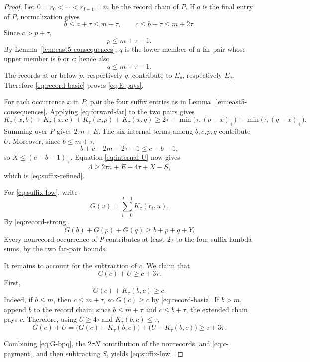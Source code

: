 \documentclass[11pt]{article}
\theoremstyle{definition}
\theoremstyle{remark}
\begin{document}
\begin{proof}
Let \(0=r_0<\cdots<r_{I-1}=m\) be the record chain of \(P\).  If
\(a\) is the final entry of \(P\), normalization gives
\[
  b\le a+\tau\le m+\tau,
  \qquad c\le b+\tau\le m+2\tau.
\]
Since \(c>p+\tau\),
\[
  p\le m+\tau-1.
\]
By Lemma~\ref{lem:east5-consequences}, \(q\) is the lower member of a
far pair whose upper member is \(b\) or \(c\); hence also
\[
  q\le m+\tau-1.
\]
The records at or below \(p\), respectively \(q\), contribute to
\(E_p\), respectively \(E_q\).  Therefore
\eqref{eq:record-basic} proves \eqref{eq:E-pays}.

For each occurrence \(x\) in \(P\), pair the four suffix entries as in
Lemma~\ref{lem:east5-consequences}.  Applying
\eqref{eq:forward-far} to the two pairs gives
\[
  K_\tau(x,b)+K_\tau(x,c)+K_\tau(x,p)+K_\tau(x,q)
  \ge2\tau+
  \min\bigl(\tau,(p-x)_+\bigr)+
  \min\bigl(\tau,(q-x)_+\bigr).
\]
Summing over \(P\) gives \(2\tau n+E\).  The six internal terms among
\(b,c,p,q\) contribute \(U\).  Moreover, since \(b\le m+\tau\),
\[
  b+c-2m-2\tau-1\le c-b-1,
\]
so \(X\le(c-b-1)_+\).  Equation \eqref{eq:internal-U} now gives
\[
  \Lambda\ge2\tau n+E+4\tau+X-S,
\]
which is \eqref{eq:suffix-refined}.

For \eqref{eq:suffix-low}, write
\[
  G(u)=\sum_{i=0}^{I-1}K_\tau(r_i,u).
\]
By \eqref{eq:record-strong},
\begin{equation}
  G(b)+G(p)+G(q)\ge b+p+q+Y.
  \label{eq:G-bpq}
\end{equation}
Every nonrecord occurrence of \(P\) contributes at least \(2\tau\) to
the four suffix lambda sums, by the two far-pair bounds.

It remains to account for the subtraction of \(c\).  We claim that
\begin{equation}
  G(c)+U\ge c+3\tau.
  \label{eq:c-payment}
\end{equation}
First,
\[
  G(c)+K_\tau(b,c)\ge c.
\]
Indeed, if \(b\le m\), then \(c\le m+\tau\), so \(G(c)\ge c\) by
\eqref{eq:record-basic}.  If \(b>m\), append \(b\) to the record chain;
since \(b\le m+\tau\) and \(c\le b+\tau\), the extended chain pays
\(c\).  Therefore, using \(U\ge4\tau\) and
\(K_\tau(b,c)\le\tau\),
\[
  G(c)+U
  =\bigl(G(c)+K_\tau(b,c)\bigr)
   +\bigl(U-K_\tau(b,c)\bigr)
  \ge c+3\tau.
\]

Combining \eqref{eq:G-bpq}, the \(2\tau N\) contribution of the
nonrecords, and \eqref{eq:c-payment}, and then subtracting \(S\), yields
\eqref{eq:suffix-low}.
\end{proof}
\end{document}
